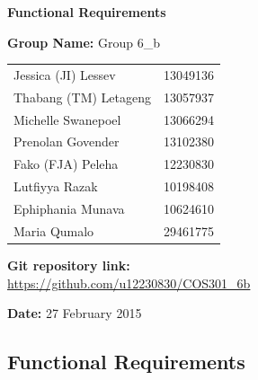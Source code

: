 \documentclass[a4paper,11pt]{article}
\begin{document}
\begin{center}

\Huge\textbf{Functional Requirements\\}
																											
\vspace{2 cm}

\LARGE\textbf{Group Name:} Group 6\_b\newline
 
\vspace{0.5 cm}
\begin{tabular}{lr}
Jessica (JI) Lessev&13049136\\
Thabang (TM) Letageng&13057937\\
Michelle Swanepoel&13066294\\
Prenolan Govender&13102380\\
Fako (FJA) Peleha&12230830\\
Lutfiyya Razak&10198408\\
Ephiphania Munava&10624610\\
Maria Qumalo&29461775\\
\end{tabular}

\vspace{1cm}
\textbf{Git repository link:\\}
\url{https://github.com/u12230830/COS301\_6b}

\vspace{1cm}
\textbf{Date:} 27 February 2015
\end{center}




\newpage

\begin{center}
\huge\section{Functional Requirements}
\end{center}
\end{document}
